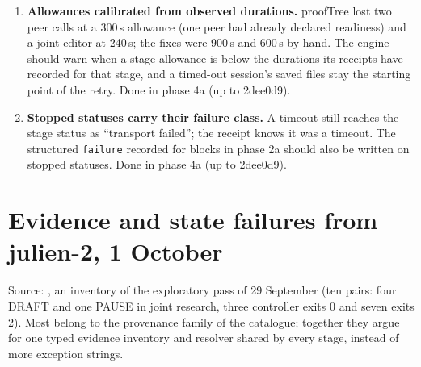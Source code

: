 \documentclass[11pt,a4paper]{article}
\begin{document}
\begin{enumerate}[label=\textbf{S\arabic*}]
  not an import), a workspace-local \texttt{TMPDIR} and \texttt{TMPPREFIX}, read
  access to the TeX installation with \texttt{TEXINPUTS} preserved and local TeX
  caches, and must count tool errors per call in the receipt.
  Done in phase 3a (up to bf8d85e): workspace ledger helper, local \texttt{TMPDIR}, \texttt{TMPPREFIX} and \texttt{TEXMFVAR}, \texttt{tool\_errors} in receipts; TeX read access remains a deployment sandbox matter.
  Deployment notes from the phase 3a review: deployments that track thread
  directories in git should ignore ; julien-2 dispatches
  through its own \texttt{eva2} transport, so neither \texttt{reads} nor the workspace
  environment reaches its agents until it adopts the engine transport; a read-only Codex
  verifier cannot use here-documents. Single-engine peers still receive both papers
  inline when a campaign sets \texttt{inline\_papers}, which statarb no longer does.
\item \textbf{Allowances calibrated from observed durations.} proofTree lost two
  peer calls at a 300\,s allowance (one peer had already declared readiness) and a
  joint editor at 240\,s; the fixes were 900\,s and 600\,s by hand. The engine should
  warn when a stage allowance is below the durations its receipts have recorded for
  that stage, and a timed-out session's saved files stay the starting point of the
  retry.
  Done in phase 4a (up to 2dee0d9).
\item \textbf{Stopped statuses carry their failure class.} A timeout still reaches
  the stage status as ``transport failed''; the receipt knows it was a timeout. The
  structured \texttt{failure} recorded for blocks in phase 2a should also be written
  on stopped statuses.
  Done in phase 4a (up to 2dee0d9).
\end{enumerate}

\section{Evidence and state failures from julien-2, 1 October}\label{sec:julien-evidence}

Source: ,
an inventory of the exploratory pass of 29 September (ten pairs: four DRAFT and one
PAUSE in joint research, three controller exits 0 and seven exits 2). Most belong to
the provenance family of the catalogue; together they argue for one typed evidence
inventory and resolver shared by every stage, instead of more exception strings.
\end{document}

